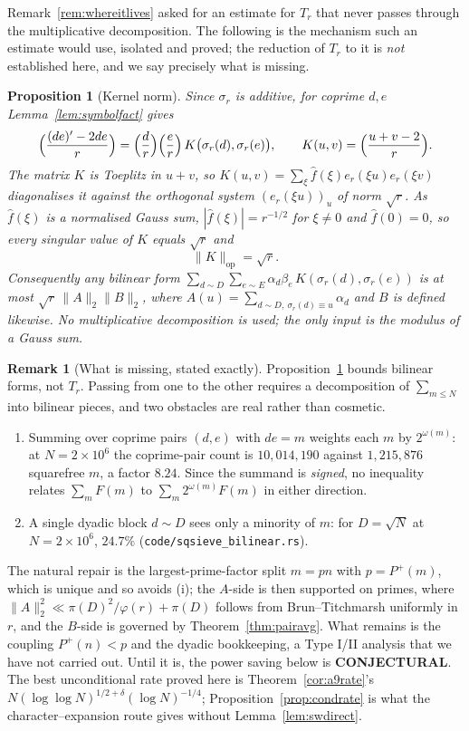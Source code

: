 \documentclass[11pt]{article}
\newtheorem{proposition}[theorem]{Proposition}
\theoremstyle{definition}
\newtheorem{remark}[theorem]{Remark}
\begin{document}
Remark~\ref{rem:whereitlives} asked for an estimate for $T_r$ that never passes through the
multiplicative decomposition. The following is the mechanism such an estimate would use, isolated
and proved; the reduction of $T_r$ to it is \emph{not} established here, and we say precisely what
is missing.

\begin{proposition}[Kernel norm]\label{prop:bilinear}
Since $\sigma_r$ is additive, for coprime $d,e$ Lemma~\ref{lem:symbolfact} gives
\[ \Bigl(\frac{(de)'-2de}{r}\Bigr)=\Bigl(\frac{d}{r}\Bigr)\Bigl(\frac{e}{r}\Bigr)\,
   K\bigl(\sigma_r(d),\sigma_r(e)\bigr),\qquad K(u,v)=\Bigl(\frac{u+v-2}{r}\Bigr). \]
The matrix $K$ is Toeplitz in $u+v$, so $K(u,v)=\sum_\xi\widehat f(\xi)e_r(\xi u)e_r(\xi v)$
diagonalises it against the orthogonal system $(e_r(\xi u))_u$ of norm $\sqrt r$. As $\widehat f(\xi)$
is a normalised Gauss sum, $|\widehat f(\xi)|=r^{-1/2}$ for $\xi\neq0$ and $\widehat f(0)=0$, so every
singular value of $K$ equals $\sqrt r$ and
\[ \|K\|_{\mathrm{op}}=\sqrt r . \]
Consequently \emph{any} bilinear form $\sum_{d\sim D}\sum_{e\sim E}\alpha_d\beta_e\,
K(\sigma_r(d),\sigma_r(e))$ is at most $\sqrt r\,\|A\|_2\|B\|_2$, where
$A(u)=\sum_{d\sim D,\ \sigma_r(d)\equiv u}\alpha_d$ and $B$ is defined likewise. No multiplicative
decomposition is used; the only input is the modulus of a Gauss sum.
\end{proposition}

\begin{remark}[What is missing, stated exactly]\label{rem:missingdecomp}
Proposition~\ref{prop:bilinear} bounds bilinear forms, not $T_r$. Passing from one to the other
requires a decomposition of $\sum_{m\le N}$ into bilinear pieces, and two obstacles are real rather
than cosmetic.
\begin{enumerate}[label=\textup{(\roman*)},leftmargin=2.2em]
\item Summing over coprime pairs $(d,e)$ with $de=m$ weights each $m$ by $2^{\omega(m)}$: at
$N=2\times10^6$ the coprime-pair count is $10{,}014{,}190$ against $1{,}215{,}876$ squarefree $m$, a
factor $8.24$. Since the summand is \emph{signed}, no inequality relates $\sum_m F(m)$ to
$\sum_m 2^{\omega(m)}F(m)$ in either direction.
\item A single dyadic block $d\sim D$ sees only a minority of $m$: for $D=\sqrt N$ at
$N=2\times10^6$, $24.7\%$ \textup{(\texttt{code/sqsieve\_bilinear.rs})}.
\end{enumerate}
The natural repair is the largest-prime-factor split $m=pn$ with $p=P^{+}(m)$, which is unique and so
avoids \textup{(i)}; the $A$-side is then supported on primes, where $\|A\|_2^2\ll\pi(D)^2/\varphi(r)+\pi(D)$
follows from Brun--Titchmarsh uniformly in $r$, and the $B$-side is governed by
Theorem~\ref{thm:pairavg}. What remains is the coupling $P^{+}(n)<p$ and the dyadic bookkeeping, a
Type I/II analysis that we have not carried out. Until it is, the power saving below is
\textbf{CONJECTURAL}. The best unconditional rate proved here is
Theorem~\ref{cor:a9rate}'s $N(\log\log N)^{1/2+\delta}(\log N)^{-1/4}$; Proposition~\ref{prop:condrate}
is what the character--expansion route gives without Lemma~\ref{lem:swdirect}.
\end{remark}
\end{document}
